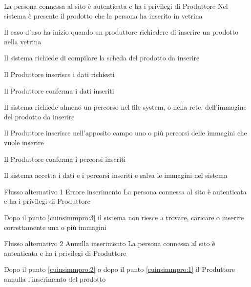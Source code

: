 \tabcuvspace

{}
{La persona connessa al sito è autenticata e ha i privilegi di Produttore}
{Nel sistema è presente il prodotto che la persona ha inserito in vetrina}
{\begin{enumCU}
		\item Il caso d'uso ha inizio quando un produttore richiedere di inserire un prodotto nella vetrina
		\item Il sistema richiede di compilare la scheda del prodotto da inserire
		\item Il Produttore inserisce i dati richiesti \label{cuinsimmpro:1}
		\item Il Produttore conferma i dati inseriti 
		\item Il sistema richiede almeno un percorso nel file system, o nella rete, dell'immagine del prodotto da inserire
		\item Il Produttore inserisce nell'apposito campo uno o più percorsi  delle immagini che vuole inserire \label{cuinsimmpro:2}
		\item Il Produttore conferma i percorsi inseriti \label{cuinsimmpro:3}
		\item Il sistema accetta i dati e i percorsi inseriti e salva le immagini nel sistema
	\end{enumCU}}
%
{Flusso alternativo 1}%
{Errore inserimento}%
{La persona connessa al sito è autenticata e ha i privilegi di Produttore}%
{\postNulle}%
{\begin{enumCU}
		\item Dopo il punto \ref{cuinsimmpro:3} il sistema non riesce a trovare, caricare o inserire correttamente una o più immagini
	\end{enumCU}}%
%
{Flusso alternativo 2}%
{Annulla inserimento}%
{La persona connessa al sito è autenticata e ha i privilegi di Produttore}%
{\postNulle}%
{\begin{enumCU}
		\item Dopo il punto \ref{cuinsimmpro:2} o dopo il punto \ref{cuinsimmpro:1} il Produttore annulla l'inserimento del prodotto
	\end{enumCU}}%

\tabcuvspace

